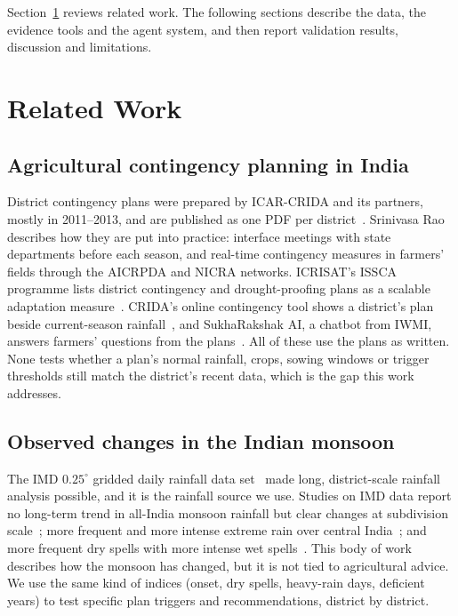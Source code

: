Section~\ref{sec:related} reviews related work. The following sections describe the
data, the evidence tools and the agent system, and then report validation results,
discussion and limitations.

\section{Related Work}
\label{sec:related}

\subsection{Agricultural contingency planning in India}
District contingency plans were prepared by ICAR-CRIDA and its partners, mostly in
2011--2013, and are published as one PDF per district~\cite{crida_plans}. Srinivasa
Rao~\cite{rao2016realtime} describes how they are put into practice: interface
meetings with state departments before each season, and real-time contingency
measures in farmers' fields through the AICRPDA and NICRA networks. ICRISAT's ISSCA
programme lists district contingency and drought-proofing plans as a scalable
adaptation measure~\cite{icrisat_issca}. CRIDA's online contingency tool shows a
district's plan beside current-season rainfall~\cite{crida_plans}, and
SukhaRakshak AI, a chatbot from IWMI, answers farmers' questions from the
plans~\cite{iwmi2025sukha}. All of these use the plans as written. None tests
whether a plan's normal rainfall, crops, sowing windows or trigger thresholds still
match the district's recent data, which is the gap this work addresses.

\subsection{Observed changes in the Indian monsoon}
The IMD $0.25^\circ$ gridded daily rainfall data set~\cite{pai2014gridded} made
long, district-scale rainfall analysis possible, and it is the rainfall source we
use. Studies on IMD data report no long-term trend in all-India monsoon rainfall but
clear changes at subdivision scale~\cite{guhathakurta2008trends}; more frequent and
more intense extreme rain over central
India~\cite{goswami2006extreme,roxy2017threefold}; and more frequent dry spells with
more intense wet spells~\cite{singh2014spells}. This body of work describes how the
monsoon has changed, but it is not tied to agricultural advice. We use the same kind
of indices (onset, dry spells, heavy-rain days, deficient years) to test specific plan
triggers and recommendations, district by district.


